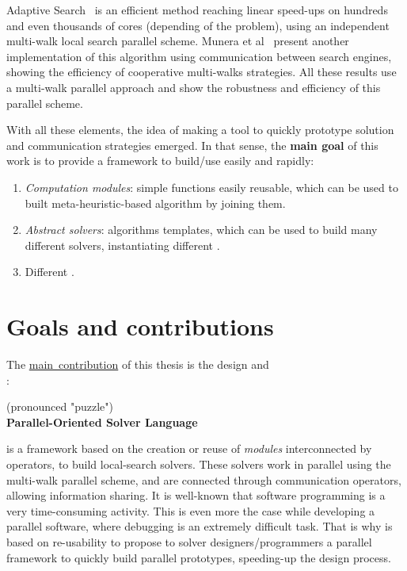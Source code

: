 Adaptive Search~\cite{Diaz} is an efficient method reaching linear speed-ups on hundreds and even thousands of cores (depending of the problem), using an independent multi-walk local search parallel scheme. Munera et al~\cite{Munera} present another implementation of this algorithm using communication between search engines, showing the efficiency of cooperative multi-walks strategies. All these results use a multi-walk parallel approach and show the robustness and efficiency of this parallel scheme. %

With all these elements, the idea of making a tool to quickly prototype solution and communication strategies emerged. In that sense, the \textbf{main goal} of this work is to provide a framework to build/use easily and rapidly:
\begin{enumerate}
\item \textit{Computation modules}: simple functions easily reusable, which can be used to built meta-heuristic-based algorithm by joining them.
\item \textit{Abstract solvers}: algorithms templates, which can be used to build many different solvers, instantiating different \oms.
\item Different \comstrs.
\end{enumerate} 

\section{Goals and contributions}

The \underline{main~contribution} of this thesis is the design and \hfill \\: 
\begin{center}
\posl{} (pronounced "puzzle")\\
\textbf{Parallel-Oriented Solver Language}
\end{center}
\posl{} is a framework based on the creation or reuse of \textit{modules} interconnected by operators, to build local-search solvers. These solvers work in parallel using the multi-walk parallel scheme, and are connected %
through communication operators, allowing information sharing. It is well-known that software programming is a very time-consuming activity. This is even more the case while developing a parallel software, where debugging is an extremely difficult task. That is why \posl{} is based on re-usability to propose to \csp{} solver designers/programmers a parallel framework to quickly build parallel prototypes, speeding-up the design process.

